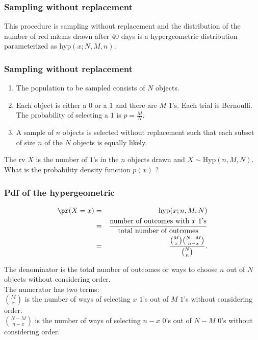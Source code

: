 \begin{frame}[fragile]\frametitle{Sampling without replacement}

This procedure is sampling without replacement and the distribution of the
number of red m\&ms drawn after $40$ days is a hypergeometric
distribution parameterized as $\mbox{hyp}(x;N,M,n).$

\end{frame}




\begin{frame}[fragile]\frametitle{Sampling without replacement}

\begin{enumerate}

\item The population to be sampled consists of $N$ objects. 

\item Each object is either a $0$ or a $1$ and there are
$M$ $1$'s. Each trial is Bernoulli. The probability of selecting
a $1$ is $p=\frac{M}{N}$. 

\item A sample of $n$ objects is selected without replacement such
  that each subset of size $n$ of the $N$ objects is equally likely. 

\end{enumerate}

The rv $X$ is the number of $1$'s in the $n$ objects drawn and
$X \sim \mbox{Hyp}(n,M,N)$. \\ 

What is the probability density function $p(x)$ ?

\end{frame}



\begin{frame}[fragile]\frametitle{Pdf of the hypergeometric}

\begin{eqnarray*}
\pr(X=x) & =&  \mbox{hyp}(x;n,M,N) \\ 
 & =&  \frac{\mbox{number of outcomes with $x$ $1$'s}}{\mbox{total
     number of outcomes}} \\ 
& =&  \frac{\binom{M}{x} \binom{N-M}{n-x}}{\binom{N}{n}}. 
\end{eqnarray*}

The denominator is the total number of outcomes or ways to choose
$n$ out of $N$ objects without considering order. \\ 

The numerator has two terms:\\
$\binom{M}{x}$ is the number of ways of selecting $x$ $1$'s out of
$M$ $1$'s without considering order. \\ 
$\binom{N-M}{n-x}$ is the number of ways of selecting $n-x$ $0$'s
out of $N-M$ $0$'s  without considering order.

\end{frame}


